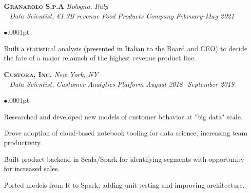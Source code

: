 \documentclass[11pt]{article}
\newcommand{\employer}[4]{
	{\hspace*{-20pt} {\small{\textbf{\textsc{ #1}}}}
  \hfill \small{\emph{#2}}\\ ~\hspace*{-20pt} \small \emph{ #3 \hfill #4}}\\ }
\newenvironment{achievements}{\begin{list}{$\bullet$}{\topsep .0001pt \itemsep -2pt}}{\vspace*{5pt}\end{list} }
\begin{document}
\employer{Granarolo S.p.A}{Bologna, Italy}{Data Scientist, \euro 1.3B revenue Food Products Company}{February-May 2021}
\begin{achievements}
    \item Built a statistical analysis (presented in Italian to the Board and CEO) to decide the fate of a major relaunch of the highest revenue product line.
\end{achievements}

\employer{Custora, Inc.}{New York, NY}{Data Scientist, Customer Analytics Platform}{August 2018- September 2019}
	\begin{achievements}
	\item Researched and developed new models of customer behavior at "big data" scale.
	\item Drove adoption of cloud-based notebook tooling for data science, increasing team productivity.
	\item Built product backend in Scala/Spark for identifying segments with opportunity for increased sales.
	\item Ported models from R to Spark, adding unit testing and improving architecture.
	\end{achievements}
\end{document}
